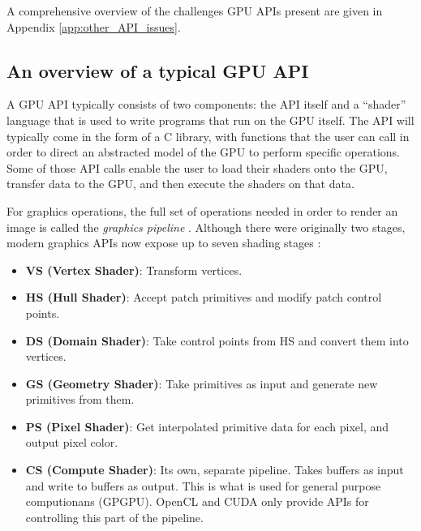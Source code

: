 \documentclass[a4paper,12pt,twoside,openright]{report}
\begin{document}
A comprehensive overview of the challenges GPU APIs present are given in
Appendix \ref{app:other_API_issues}.

\subsection{An overview of a typical GPU API}

\label{sec:graphics_api_overview}

A GPU API typically consists of two components: the API itself and a ``shader''
language that is used to write programs that run on the GPU itself. The API
will typically come in the form of a C library, with functions that the user
can call in order to direct an abstracted model of the GPU to perform specific
operations. Some of those API calls enable the user to load their shaders onto
the GPU, transfer data to the GPU, and then execute the shaders on that data.

For graphics operations, the full set of operations needed in order to render
an image is called the \textit{graphics pipeline}
\cite{TripThroughGraphicsPipeline1}. Although there were originally two stages,
modern graphics APIs now expose up to seven shading stages
\cite{TripThroughGraphicsPipeline3}:

\begin{itemize}

    \item \textbf{VS (Vertex Shader)}: Transform vertices.

    \item \textbf{HS (Hull Shader)}: Accept patch primitives and modify patch
    control points.

    \item \textbf{DS (Domain Shader)}: Take control points from HS and convert
    them into vertices.

    \item \textbf{GS (Geometry Shader)}: Take primitives as input and generate
    new primitives from them.

    \item \textbf{PS (Pixel Shader)}: Get interpolated primitive data for each
    pixel, and output pixel color.

    \item \textbf{CS (Compute Shader)}: Its own, separate pipeline. Takes
    buffers as input and write to buffers as output. This is what is used for
    general purpose computionans (GPGPU). OpenCL and CUDA only provide APIs for
    controlling this part of the pipeline.

\end{itemize}
\end{document}
